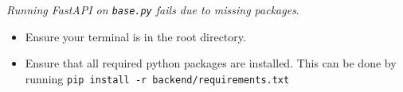 \documentclass{article}
\begin{document}
\noindent \textit{Running FastAPI on \texttt{base.py} fails due to missing packages}.

\begin{itemize}
	\item Ensure your terminal is in the root directory.
	\item Ensure that all required python packages are installed. This can be done by running \texttt{pip install -r backend/requirements.txt}
\end{itemize}
\end{document}
